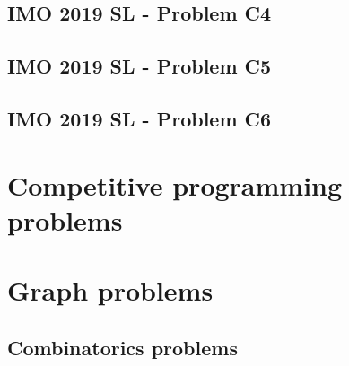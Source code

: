 \documentclass[12pt,openany,oneside]{book}
\theoremstyle{definition}
\numberwithin{definition}{section}
\numberwithin{theorem}{section}
\numberwithin{corollary}{section}
\numberwithin{proposition}{section}
\numberwithin{notation}{section}
\numberwithin{remark}{section}
\numberwithin{hypothesis}{section}
\numberwithin{example}{section}
\begin{document}
\section{IMO 2019 SL - Problem C4}
\section{IMO 2019 SL - Problem C5}
\section{IMO 2019 SL - Problem C6}

\chapter{Competitive programming problems}

\chapter{Graph problems}
\section{Combinatorics problems}



\end{document}
